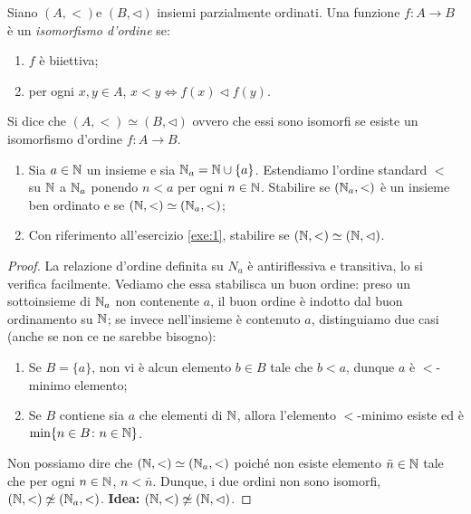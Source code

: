 \begin{exe}
  Siano \((A,<)\)e \((B,\lhd)\) insiemi parzialmente ordinati. Una funzione \(f \colon A \to B\) è un \emph{isomorfismo d'ordine} se:
  \begin{enumerate}
    \item \(f\) è biiettiva;
    \item per ogni \(x,y \in A\), \(x < y \iff f(x) \lhd f(y)\).
  \end{enumerate}
  Si dice che \((A,<) \simeq (B, \lhd)\) ovvero che essi sono isomorfi se esiste un isomorfismo d'ordine \(f \colon A \to B\).
  \begin{enumerate}
    \item Sia \(a \in \mathbb{N}\) un insieme e sia \(\mathbb{N}_a = \mathbb{N} \cup \lbrace a \rbrace\). Estendiamo l'ordine standard \(<\) su \(\mathbb{N}\) a \(\mathbb{N}_a\) ponendo \(n < a\) per ogni \(n \in \mathbb{N}\). Stabilire se \((\mathbb{N}_a,<)\) è un insieme ben ordinato e se \((\mathbb{N},<) \simeq (\mathbb{N}_a,<)\);
    \item Con riferimento all'esercizio \ref{exe:1}, stabilire se \((\mathbb{N},<)\simeq(\mathbb{N},\lhd)\).
  \end{enumerate}
\end{exe}
\begin{proof}
  La relazione d'ordine definita su \(N_a\) è antiriflessiva e transitiva, lo si verifica facilmente. Vediamo che essa stabilisca un buon ordine: preso un sottoinsieme di \(\mathbb{N}_a\) non contenente \(a\), il buon ordine è indotto dal buon ordinamento su \(\mathbb{N}\); se invece nell'insieme è contenuto \(a\), distinguiamo due casi (anche se non ce ne sarebbe bisogno):
  \begin{enumerate}
    \item Se \(B = \lbrace a \rbrace\), non vi è alcun elemento \(b \in B\) tale che \(b < a\), dunque \(a\) è \(<\)-minimo elemento;
    \item Se \(B\) contiene sia \(a\) che elementi di \(\mathbb{N}\), allora l'elemento \(<\)-minimo esiste ed è \(\min \lbrace n \in B \colon n \in \mathbb{N} \rbrace\).
  \end{enumerate}
  Non possiamo dire che \((\mathbb{N},<)\simeq(\mathbb{N}_a,<)\) poiché non esiste elemento \(\bar{n} \in \mathbb{N}\) tale che per ogni \(n \in \mathbb{N}\), \(n < \bar{n}\). Dunque, i due ordini non sono isomorfi, \((\mathbb{N},<) \not\simeq(\mathbb{N}_a,<)\).
  {\bf Idea:} \((\mathbb{N},<) \not\simeq (\mathbb{N}, \lhd)\).
\end{proof}

